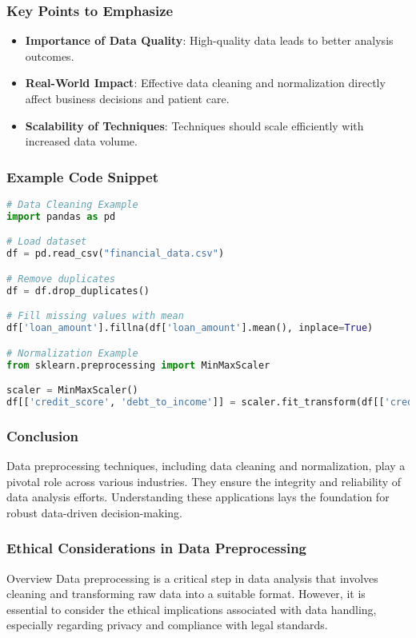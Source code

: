 \documentclass{beamer}
\begin{document}
\begin{frame}[fragile]
    \frametitle{Key Points to Emphasize}
    \begin{itemize}
        \item \textbf{Importance of Data Quality}: High-quality data leads to better analysis outcomes.
        \item \textbf{Real-World Impact}: Effective data cleaning and normalization directly affect business decisions and patient care.
        \item \textbf{Scalability of Techniques}: Techniques should scale efficiently with increased data volume.
    \end{itemize}
\end{frame}

\begin{frame}[fragile]
    \frametitle{Example Code Snippet}
    \begin{lstlisting}[language=Python]
# Data Cleaning Example
import pandas as pd

# Load dataset
df = pd.read_csv("financial_data.csv")

# Remove duplicates
df = df.drop_duplicates()

# Fill missing values with mean
df['loan_amount'].fillna(df['loan_amount'].mean(), inplace=True)

# Normalization Example
from sklearn.preprocessing import MinMaxScaler

scaler = MinMaxScaler()
df[['credit_score', 'debt_to_income']] = scaler.fit_transform(df[['credit_score', 'debt_to_income']])
    \end{lstlisting}
\end{frame}

\begin{frame}[fragile]
    \frametitle{Conclusion}
    Data preprocessing techniques, including data cleaning and normalization, play a pivotal role across various industries. They ensure the integrity and reliability of data analysis efforts. Understanding these applications lays the foundation for robust data-driven decision-making.
\end{frame}

\begin{frame}[fragile]
    \frametitle{Ethical Considerations in Data Preprocessing}
    \begin{block}{Overview}
        Data preprocessing is a critical step in data analysis that involves cleaning and transforming raw data into a suitable format. 
        However, it is essential to consider the ethical implications associated with data handling, especially regarding privacy and compliance with legal standards.
    \end{block}
\end{frame}
\end{document}
